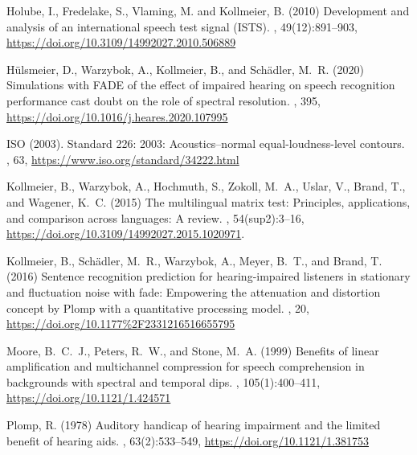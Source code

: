 \documentclass[10pt,a4paper,twocolumn]{article}
\begin{document}
\begin{thebibliography}{}
	Holube, I., Fredelake, S., Vlaming, M. and Kollmeier, B. (2010)
	\newblock Development and analysis of an international speech test signal (ISTS).
	, 49(12):891--903, \url{https://doi.org/10.3109/14992027.2010.506889}
	
    Hülsmeier, D., Warzybok, A., Kollmeier, B., and Schädler, M.~R. (2020)
	\newblock Simulations with FADE of the effect of impaired hearing on speech recognition performance cast doubt on the role of spectral resolution.
	, 395, \url{https://doi.org/10.1016/j.heares.2020.107995}
	
	ISO (2003).
	\newblock Standard 226: 2003: Acoustics--normal equal-loudness-level contours.
	, 63, \url{https://www.iso.org/standard/34222.html}
	
	Kollmeier, B., Warzybok, A., Hochmuth, S., Zokoll, M.~A., Uslar, V., Brand, T., and Wagener, K.~C. (2015)
	\newblock The multilingual matrix test: Principles, applications, and comparison across languages: A review.
	, 54(sup2):3--16, \url{https://doi.org/10.3109/14992027.2015.1020971}.
	
	Kollmeier, B., Schädler, M.~R., Warzybok, A., Meyer, B.~T., and Brand, T. (2016)
	\newblock Sentence recognition prediction for hearing-impaired listeners in	stationary and fluctuation noise with fade: Empowering the attenuation and	distortion concept by Plomp with a quantitative processing model.
	, 20, \url{https://doi.org/10.1177%2F2331216516655795}

	Moore, B.~C.~J., Peters, R.~W., and Stone, M.~A. (1999)
	\newblock Benefits of linear amplification and multichannel compression for speech comprehension in backgrounds with spectral and temporal dips.
	, 105(1):400--411, \url{https://doi.org/10.1121/1.424571}
	
	Plomp, R. (1978)
	\newblock Auditory handicap of hearing impairment and the limited benefit of hearing aids.
	, 63(2):533--549, \url{https://doi.org/10.1121/1.381753}


\end{thebibliography}
\end{document}
